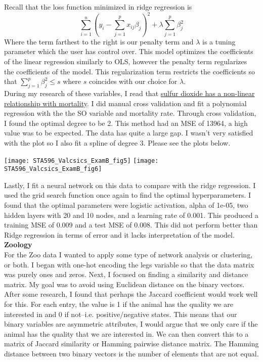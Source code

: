 \documentclass[10pt]{article}
\begin{document}
Recall that the loss function minimized in ridge regression is 
$$\sum_{i=1}^{n} \left( y_{i} - \sum_{j=1}^{p} x_{ij}\beta_{j} \right)^{2} + \lambda \sum_{j=1}^{p} \beta_{j}^{2}$$
Where the term farthest to the right is our penalty term and $\lambda$ is a tuning parameter which the user has control over. This model optimizes the coefficients of the linear regression similarly to OLS, however the penalty term regularizes the coefficients of the model. This regularization term restricts the coefficients so that $\sum_{j=1}^{p} \beta_{j}^{2} \leq s$ where $s$ coincides with our choice for $\lambda$.  \\

During my research of these variables, I read that \hyperlink{https://pubmed.ncbi.nlm.nih.gov/29384437/}{sulfur dioxide has a non-linear relationship with mortality}. I did manual cross validation and fit a polynomial regression with the the SO variable and mortality rate. Through cross validation, I found the optimal degree to be 2. This method had an MSE of 13964, a high value was to be expected. The data has quite a large gap. I wasn't very satisfied with the plot so I also fit a spline of degree 3. Please see the plots below. 
\begin{center}
	\texttt{[image: STA596\_Valcsics\_ExamB\_fig5]}
	\texttt{[image: STA596\_Valcsics\_ExamB\_fig6]}
\end{center}
Lastly, I fit a neural network on this data to compare with the ridge regression. I used the grid search function once again to find the optimal hyperparameters. I found that the optimal parameters were logistic activation, alpha of 1e-05, two hidden layers with 20 and 10 nodes, and a learning rate of 0.001. This produced a training MSE of 0.009 and a test MSE of 0.008. This did not perform better than Ridge regression in terms of error and it lacks interpretation of the model.
\textbf{Zoology} \\

For the Zoo data I wanted to apply some type of network analysis or clustering, or both. I began with one-hot encoding the legs variable so that the data matrix was purely ones and zeros. Next, I focused on finding a similarity and distance matrix. My goal was to avoid using Euclidean distance on the binary vectors. After some research, I found that perhaps the Jaccard coefficient would work well for this. For each entry, the value is 1 if the animal has the quality we are interested in and 0 if not--i.e. positive/negative states. This means that our binary variables are asymmetric attributes, I would argue that we only care if the animal has the quality that we are interested in. We can then convert this to a matrix of Jaccard similarity or Hamming pairwise distance matrix. The Hamming distance between two binary vectors is the number of elements that are not equal.\\
\end{document}
